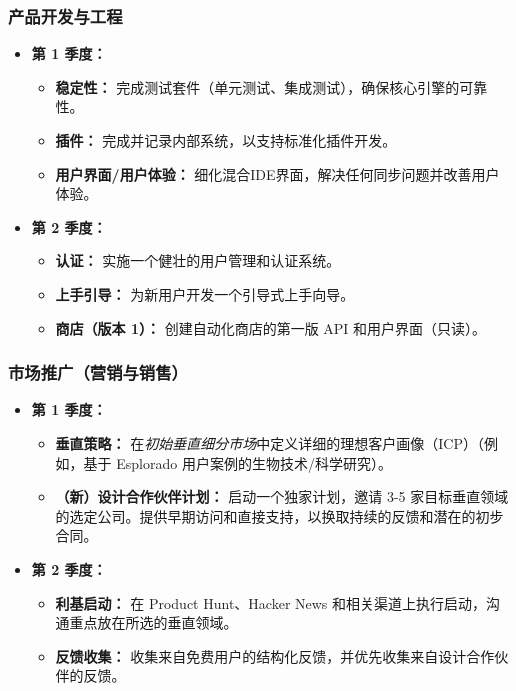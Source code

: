 \documentclass[11pt, a4paper, oneside]{article}
\begin{document}
\subsubsection*{产品开发与工程}
\begin{itemize}[leftmargin=*]
    \item \textbf{第 1 季度：}
    \begin{itemize}
        \item \textbf{稳定性：} 完成测试套件（单元测试、集成测试），确保核心引擎的可靠性。
        \item \textbf{插件：} 完成并记录内部系统，以支持标准化插件开发。
        \item \textbf{用户界面/用户体验：} 细化混合IDE界面，解决任何同步问题并改善用户体验。
    \end{itemize}
    \item \textbf{第 2 季度：}
    \begin{itemize}
        \item \textbf{认证：} 实施一个健壮的用户管理和认证系统。
        \item \textbf{上手引导：} 为新用户开发一个引导式上手向导。
        \item \textbf{商店（版本 1）：} 创建自动化商店的第一版 API 和用户界面（只读）。
    \end{itemize}
\end{itemize}

\subsubsection*{市场推广（营销与销售）}
\begin{itemize}[leftmargin=*]
    \item \textbf{第 1 季度：}
    \begin{itemize}
        \item \textbf{垂直策略：} 在\textit{初始垂直细分市场}中定义详细的理想客户画像（ICP）（例如，基于 Esplorado 用户案例的生物技术/科学研究）。
        \item \textbf{（新）设计合作伙伴计划：} 启动一个独家计划，邀请 3-5 家目标垂直领域的选定公司。提供早期访问和直接支持，以换取持续的反馈和潜在的初步合同。
    \end{itemize}
    \item \textbf{第 2 季度：}
    \begin{itemize}
        \item \textbf{利基启动：} 在 Product Hunt、Hacker News 和相关渠道上执行启动，沟通重点放在所选的垂直领域。
        \item \textbf{反馈收集：} 收集来自免费用户的结构化反馈，并优先收集来自设计合作伙伴的反馈。
    \end{itemize}
\end{itemize}
\end{document}
